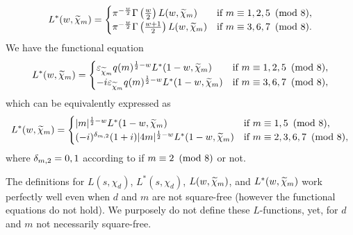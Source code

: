 \documentclass[12pt,reqno,oneside]{amsart}
\begin{document}
    \[
        L^{\ast}(w,\widetilde{\chi}_{m}) = \begin{cases} \pi^{-\frac{w}{2}}\Gamma\left(\frac{w}{2}\right)L(w,\widetilde{\chi}_{m}) & \text{if $m \equiv 1,2,5 \ \left(\text{mod }8\right)$}, \\ \pi^{-\frac{w}{2}}\Gamma\left(\frac{w+1}{2}\right)L(w,\widetilde{\chi}_{m}) & \text{if $m \equiv 3,6,7 \ \left(\text{mod }8\right)$}. \end{cases}
    \]
    We have the functional equation
    \[
        L^{\ast}(w,\widetilde{\chi}_{m}) = \begin{cases} \varepsilon_{\widetilde{\chi}_{m}}q(m)^{\frac{1}{2}-w}L^{\ast}(1-w,\widetilde{\chi}_{m}) & \text{if $m \equiv 1,2,5 \ \left(\text{mod }8\right)$}, \\ -i\varepsilon_{\widetilde{\chi}_{m}}q(m)^{\frac{1}{2}-w}L^{\ast}(1-w,\widetilde{\chi}_{m}) & \text{if $m \equiv 3,6,7 \ \left(\text{mod }8\right)$}, \end{cases}
    \]
    which can be equivalently expressed as
    \[
        L^{\ast}(w,\widetilde{\chi}_{m}) = \begin{cases} |m|^{\frac{1}{2}-w}L^{\ast}(1-w,\widetilde{\chi}_{m}) & \text{if $m \equiv 1,5 \ \left(\text{mod }8\right)$}, \\ (-i)^{\delta_{m,2}}(1+i)|4m|^{\frac{1}{2}-w}L^{\ast}(1-w,\widetilde{\chi}_{m}) & \text{if $m \equiv 2,3,6,7 \ \left(\text{mod }8\right)$}, \end{cases}
    \]
    where $\delta_{m,2} = 0,1$ according to if $m \equiv 2 \ \left(\text{mod }8\right)$ or not.

    \begin{remark}
        The definitions for $L(s,\chi_{d})$, $L^{\ast}(s,\chi_{d})$, $L(w,\widetilde{\chi}_{m})$, and $L^{\ast}(w,\widetilde{\chi}_{m})$ work perfectly well even when $d$ and $m$ are not square-free (however the functional equations do not hold). We purposely do not define these $L$-functions, yet, for $d$ and $m$ not necessarily square-free.
    \end{remark}
\end{document}
